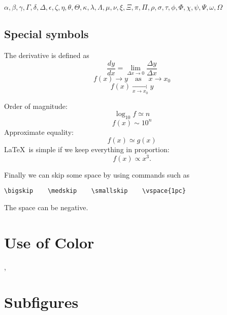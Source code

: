 \documentclass[12pt]{article}
\begin{document}
 $\alpha,
 \beta, \gamma, \Gamma,
 \delta,\Delta,
 \epsilon, \zeta, \eta, \theta, \Theta, \kappa,
 \lambda, \Lambda, \mu, \nu,
 \xi, \Xi,
 \pi, \Pi,
 \rho,
 \sigma,
 \tau,
 \phi, \Phi,
 \chi,
 \psi, \Psi,
 \omega, \Omega$

 \subsection{Special symbols}

 The derivative is defined as
 \begin{equation}
  \frac{dy}{dx} = \lim_{\Delta x \to 0} \frac{\Delta y}
  {\Delta x}
 \end{equation}
 \begin{equation}
  f(x) \to y \quad \mbox{as} \quad x \to
  x_{0}
 \end{equation}
 \begin{equation}
  f(x) \mathop {\longrightarrow}
  \limits_{x \to x_0} y
 \end{equation}

 \noindent Order of magnitude:
 \begin{equation}
  \log_{10}f \simeq n
 \end{equation}
 \begin{equation}
  f(x)\sim 10^{n}
 \end{equation}
 Approximate equality:
 \begin{equation}
  f(x)\simeq g(x)
 \end{equation}
 \LaTeX\ is simple if we keep everything in proportion:
 \begin{equation}
  f(x) \propto x^3 .
 \end{equation}

 Finally we can skip some space by using commands such as
 \begin{verbatim}
\bigskip    \medskip    \smallskip    \vspace{1pc}
 \end{verbatim}
 The space can be negative.

 \section{\color{red}Use of Color}

 {\color{blue}{We can change colors for emphasis}},
  {\color{green}{but}} {\color{cyan}{who is going pay for the ink?}}

 \section{\label{morefig}Subfigures}
\end{document}
